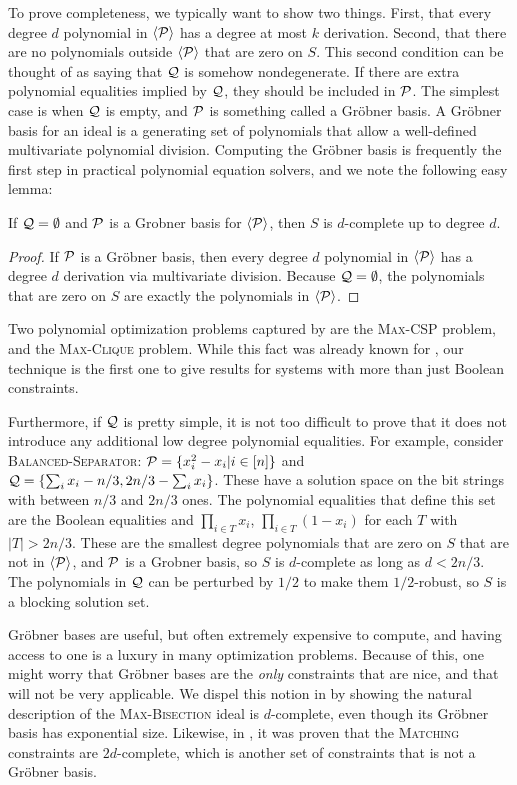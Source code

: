 To prove completeness, we typically want to show two things. First, that every degree $d$ polynomial in $\langle \mathcal P\rangle$ has a degree at most $k$ derivation. Second, that there are no polynomials outside $\langle \mathcal P\rangle$ that are zero on $S$. This second condition can be thought of as saying that $\mathcal Q$ is somehow nondegenerate. If there are extra polynomial equalities implied by $\mathcal Q$, they should be included in $\mathcal P$. The simplest case is when $\mathcal Q$ is empty, and $\mathcal P$ is something called a Gr\"obner basis. A Gr\"obner basis for an ideal is a generating set of polynomials that allow a well-defined multivariate polynomial division. Computing the Gr\"obner basis is frequently the first step in practical polynomial equation solvers, and we note the following easy lemma:
\begin{lemma}\label{lem:grobner}
If $\mathcal Q = \emptyset$ and $\mathcal P$ is a Grobner basis for $\langle \mathcal P\rangle$, then $S$ is $d$-complete up to degree $d$. 
\end{lemma}
\begin{proof}
If $\mathcal P$ is a Gr\"obner basis, then every degree $d$ polynomial in $\langle \mathcal P\rangle$ has a degree $d$ derivation via multivariate division. Because $\mathcal Q = \emptyset$, the polynomials that are zero on $S$ are exactly the polynomials in $\langle \mathcal P\rangle$. 
\end{proof}
Two polynomial optimization problems captured by  are the \textsc{Max-CSP} problem, and the \textsc{Max-Clique} problem. While this fact was already known for , our technique is the first one to give results for systems with more than just Boolean constraints.

Furthermore, if $\mathcal Q$ is pretty simple, it is not too difficult to prove that it does not introduce any additional low degree polynomial equalities. For example, consider \textsc{Balanced-Separator}: $\mathcal P = \{x_i^2-x_i | i \in [n]\}$ and $\mathcal Q = \{\sum_i x_i - n/3, 2n/3 - \sum_i x_i\}$. These have a solution space on the bit strings with between $n/3$ and $2n/3$ ones. The polynomial equalities that define this set are the Boolean equalities and $\prod_{i \in T} x_i$, $\prod_{i \in T} (1-x_i)$ for each $T$ with $|T| > 2n/3$. These are the smallest degree polynomials that are zero on $S$ that are not in $\langle \mathcal P\rangle$, and $\mathcal P$ is a Grobner basis, so $S$ is $d$-complete as long as $d < 2n/3$. The polynomials in $\mathcal Q$ can be perturbed by $1/2$ to make them $1/2$-robust, so $S$ is a blocking solution set. 

Gr\"obner bases are useful, but often extremely expensive to compute, and having access to one is a luxury in many optimization problems. Because of this, one might worry that Gr\"obner bases are the \emph{only} constraints that are nice, and that  will not be very applicable. We dispel this notion in  by showing the natural description of the \textsc{Max-Bisection} ideal is $d$-complete, even though its Gr\"obner basis has exponential size. Likewise, in \cite{Braun:2016:MPN:2884435.2884510}, it was proven that the \textsc{Matching} constraints are $2d$-complete, which is another set of constraints that is not a Gr\"obner basis. 

